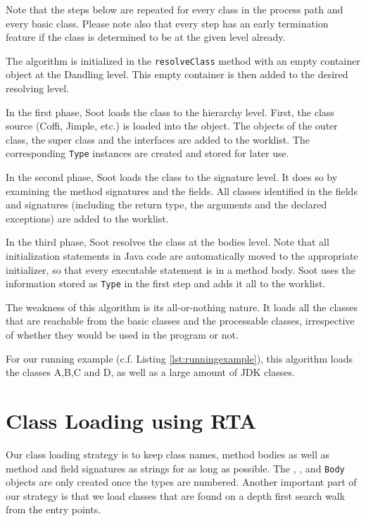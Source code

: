 \documentclass{sigplanconf}
\begin{document}
Note that the steps below are repeated for every class in the process path and every basic class. Please note also that every step has an early termination feature if the class is determined to be at the given level already.

The algorithm is initialized in the {\tt resolveClass} method with an empty \sootclass container object at the Dandling level. This empty container is then added to the desired resolving level.

In the first phase, Soot loads the class to the hierarchy level. First, the class source (Coffi, Jimple, etc.) is loaded into the \sootclass object.
The \sootclass objects of the outer class, the super class and the interfaces are added to the worklist. The corresponding {\tt Type} instances are created and stored for later use.

In the second phase, Soot loads the class to the signature level. It does so by examining the method signatures and the fields. All classes identified in the fields and signatures (including the return type, the arguments and the declared exceptions) are added to the worklist.

In the third phase, Soot resolves the class at the bodies level. Note that all initialization statements in Java code are automatically moved to the appropriate initializer, so that every executable statement is in a method body. Soot uses the information stored as {\tt Type} in the first step and adds it all to the worklist.

The weakness of this algorithm is its all-or-nothing nature. It loads all the classes that are reachable from the basic classes and the processable classes, irrespective of whether they would be used in the program or not.

For our running example (c.f. Listing \ref{lst:runningexample}), this algorithm loads the classes A,B,C and D, as well as a large amount of JDK classes.

\section{Class Loading using RTA}
\label{sec:new-cl}
Our class loading strategy is to keep class names, method bodies as well as method and field signatures as strings for as long as possible.
The \sootclass, \sootmethod, \sootfield and {\tt Body} objects are only created once the types are numbered. Another important part of our strategy is that we load classes that are found on a depth first search walk from the entry points.
\end{document}
